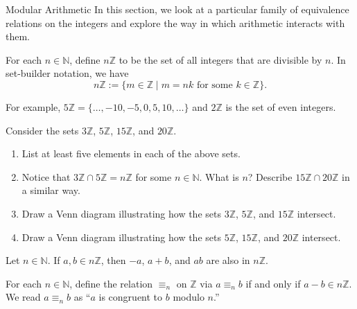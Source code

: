\begin{section}{Modular Arithmetic}\label{sec:ModularArithmetic}
In this section, we look at a particular family of equivalence relations on the integers and explore the way in which arithmetic interacts with them.

\begin{definition}
For each $n\in \mathbb{N}$, define $n\mathbb{Z}$ to be the set of all integers that are divisible by $n$. In set-builder notation, we have
\[
n\mathbb{Z} := \{m \in \mathbb{Z}  \mid m = nk \text{ for some } k \in \mathbb{Z}\}.
\]
\end{definition}

For example, $5\mathbb{Z} = \{ \ldots,-10,-5,0,5,10,\ldots\}$ and $2\mathbb{Z}$ is the set of even integers. 


\begin{problem} 
Consider the sets $3 \mathbb{Z}$, $5 \mathbb{Z}$, $15 \mathbb{Z}$, and $20 \mathbb{Z}$.
\begin{enumerate}[label=\textrm{(\alph*)}]
\item List at least five elements in each of the above sets.
\item Notice that $3 \mathbb{Z} \cap5 \mathbb{Z} = n\mathbb{Z}$ for some $n\in \mathbb{N}$. What is $n$? Describe $15\mathbb{Z}\cap 20 \mathbb{Z}$ in a similar way.
\item Draw a Venn diagram illustrating how the sets $3\mathbb{Z}$, $5\mathbb{Z}$, and $15\mathbb{Z}$ intersect.  
\item Draw a Venn diagram illustrating how the sets $5\mathbb{Z}$, $15\mathbb{Z}$, and $20\mathbb{Z}$ intersect.
\end{enumerate}
\end{problem}

\begin{theorem}
Let $n\in \mathbb{N}$. If $a,b \in n\mathbb{Z}$, then $-a$, $a+b$, and $ab$ are also in $n\mathbb{Z}$.
\end{theorem}

\begin{definition}\label{def:modulo}
For each  $n\in \mathbb{N}$,  define the relation $\equiv_n$ on $\mathbb{Z}$ via $a\equiv_n b$ if and only if $a-b \in n\mathbb{Z}$. We read $a\equiv_n b$ as ``$a$ is congruent to $b$ modulo $n$.''
\end{definition}


\end{section}
